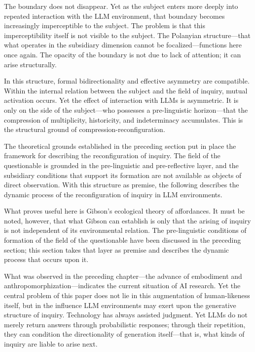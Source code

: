 \documentclass[12pt]{article}
\begin{document}
The boundary does not disappear. Yet as the subject enters more deeply into repeated interaction with the LLM environment, that boundary becomes increasingly imperceptible to the subject. The problem is that this imperceptibility itself is not visible to the subject. The Polanyian structure---that what operates in the subsidiary dimension cannot be focalized---functions here once again. The opacity of the boundary is not due to lack of attention; it can arise structurally.

In this structure, formal bidirectionality and effective asymmetry are compatible. Within the internal relation between the subject and the field of inquiry, mutual activation occurs. Yet the effect of interaction with LLMs is asymmetric. It is only on the side of the subject---who possesses a pre-linguistic horizon---that the compression of multiplicity, historicity, and indeterminacy accumulates. This is the structural ground of compression-reconfiguration.

The theoretical grounds established in the preceding section put in place the framework for describing the reconfiguration of inquiry. The field of the questionable is grounded in the pre-linguistic and pre-reflective layer, and the subsidiary conditions that support its formation are not available as objects of direct observation. With this structure as premise, the following describes the dynamic process of the reconfiguration of inquiry in LLM environments.

What proves useful here is Gibson's ecological theory of affordances. It must be noted, however, that what Gibson can establish is only that the arising of inquiry is not independent of its environmental relation. The pre-linguistic conditions of formation of the field of the questionable have been discussed in the preceding section; this section takes that layer as premise and describes the dynamic process that occurs upon it.

What was observed in the preceding chapter---the advance of embodiment and anthropomorphization---indicates the current situation of AI research. Yet the central problem of this paper does not lie in this augmentation of human-likeness itself, but in the influence LLM environments may exert upon the generative structure of inquiry. Technology has always assisted judgment. Yet LLMs do not merely return answers through probabilistic responses; through their repetition, they can condition the directionality of generation itself---that is, what kinds of inquiry are liable to arise next.
\end{document}
